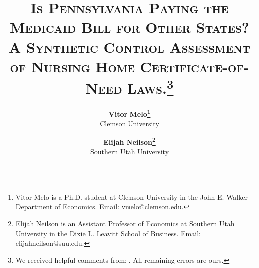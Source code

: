 \documentclass[12pt]{article}
\begin{document}

\title{\textsc{Is Pennsylvania Paying the Medicaid Bill for Other States? A Synthetic Control Assessment of Nursing Home Certificate-of-Need Laws.}\thanks{We received helpful comments from: . All remaining errors are ours.}\\
	$~$\\}

\medskip

\author{\textbf{Vitor Melo\protect\thanks{Vitor Melo is a Ph.D. student at Clemson University in the John E. Walker Department of Economics. Email: vmelo@clemson.edu.}} \\ Clemson University
\and
\textbf{Elijah Neilson\protect\thanks{Elijah Neilson is an Assistant Professor of Economics at Southern Utah University in the Dixie L. Leavitt School of Business. Email: elijahneilson@suu.edu.}} \\ Southern Utah University
  	}		

\date{}              %


\renewcommand{\thefootnote}{\fnsymbol{footnote}}

\singlespacing

\maketitle
\end{document}
